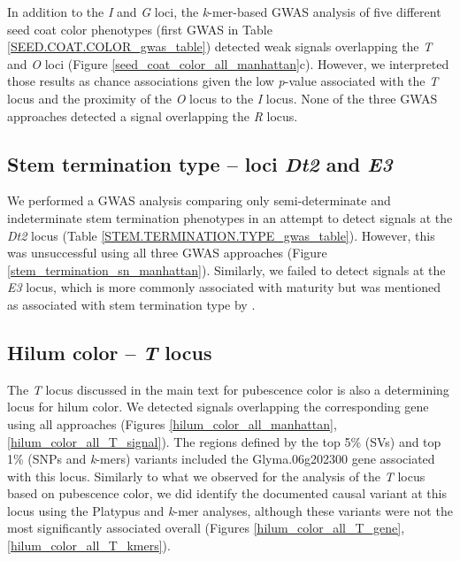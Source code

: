 \documentclass[12pt]{report}
\begin{document}
In addition to the \textit{I} and \textit{G} loci, the \textit{k}-mer-based
GWAS analysis of five different seed coat color phenotypes (first GWAS in Table
\ref{SEED.COAT.COLOR_gwas_table}) detected weak signals overlapping the
\emph{T} and \emph{O} loci (Figure \ref{seed_coat_color_all_manhattan}c).
However, we interpreted those results as chance associations given the low
\textit{p}-value associated with the \emph{T} locus and the proximity of the
\emph{O} locus to the \emph{I} locus. None of the three GWAS approaches detected
a signal overlapping the \textit{R} locus.

\subsection*{Stem termination type -- loci \textit{Dt2} and \textit{E3}}
\label{sv-gwas-stem-termination}

We performed a GWAS analysis comparing only semi-determinate and indeterminate
stem termination phenotypes in an attempt to detect signals at the \emph{Dt2}
locus (Table \ref{STEM.TERMINATION.TYPE_gwas_table}).  However, this was
unsuccessful using all three GWAS approaches (Figure
\ref{stem_termination_sn_manhattan}). Similarly, we failed to detect signals at
the \textit{E3} locus, which is more commonly associated with maturity but was
mentioned as associated with stem termination type by \cite{bandillo2017}.

\subsection*{Hilum color -- \textit{T} locus}
\label{annexe-sv-gwas-results-hilum-color-t}

The \textit{T} locus discussed in the main text for pubescence color is also a determining
locus for hilum color. We detected signals overlapping the corresponding gene
using all approaches (Figures \ref{hilum_color_all_manhattan},
\ref{hilum_color_all_T_signal}). The regions defined by the top 5\% (SVs)
and top 1\% (SNPs and \textit{k}-mers) variants included
the Glyma.06g202300 gene associated with this locus. Similarly to what we
observed for the analysis of the \textit{T} locus based on pubescence color, we
did identify the documented causal variant at this locus using the Platypus and
\textit{k}-mer analyses, although these variants were not the most
significantly associated overall (Figures \ref{hilum_color_all_T_gene},
\ref{hilum_color_all_T_kmers}).
\end{document}
